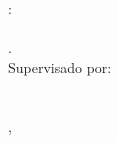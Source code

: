 \thispagestyle{empty}

\hfill

\vfill

\noindent\spacedlowsmallcaps{\myName}: \\
\textit{\myTitle} \\
{\small\textit{\mySubtitle}}. \\[\baselineskip]
\noindent Supervisado por: \\
{\spacedlowsmallcaps{\myProf} \\
\spacedlowsmallcaps{\myOtherProf}} \\[\baselineskip]
\myLocation, \myTime
